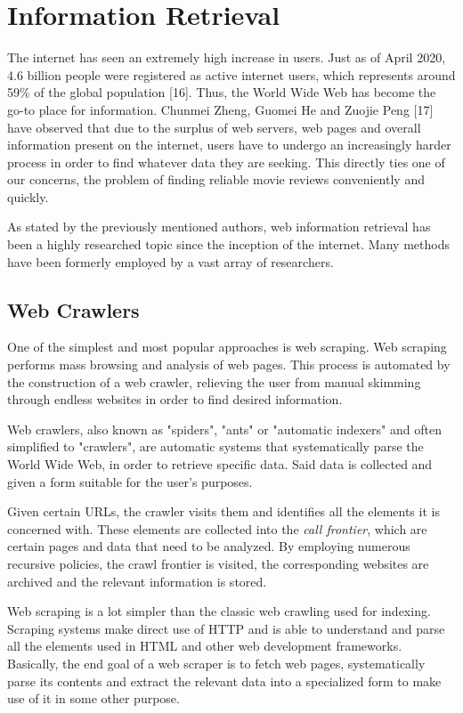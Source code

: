 \documentclass[12pt,a4paper,twoside]{report}
\begin{document}
\section{Information Retrieval}

The internet has seen an extremely high increase in users. Just as of April 2020, 4.6 billion people were registered as active internet users, which represents around 59\% of the global population [16]. Thus, the World Wide Web has become the go-to place for information. 
Chunmei Zheng, Guomei He and Zuojie Peng [17] have observed that due to the surplus of web servers, web pages and overall information present on the internet, users have to undergo an increasingly harder process in order to find whatever data they are seeking. This directly ties one of our concerns, the problem of finding reliable movie reviews conveniently and quickly.

As stated by the previously mentioned authors, web information retrieval has been a highly researched topic since the inception of the internet. Many methods have been formerly employed by a vast array of researchers. 

\subsection{Web Crawlers}

One of the simplest and most popular approaches is web scraping. Web scraping performs mass browsing and analysis of web pages. This process is automated by the construction of a web crawler, relieving the user from manual skimming through endless websites in order to find desired information.

Web crawlers, also known as "spiders", "ants" or "automatic indexers" and often simplified to "crawlers", are automatic systems that systematically parse the World Wide Web, in order to retrieve specific data. Said data is collected and given a form suitable for the user's purposes.

Given certain URLs, the crawler visits them and identifies all the elements it is concerned with. These elements are collected into the \textit{call frontier}, which are certain pages and data that need to be analyzed. By employing numerous recursive policies, the crawl frontier is visited, the corresponding websites are archived and the relevant information is stored.

Web scraping is a lot simpler than the classic web crawling used for indexing. Scraping systems make direct use of HTTP and is able to understand and parse all the elements used in HTML and other web development frameworks. Basically, the end goal of a web scraper is to fetch web pages, systematically parse its contents and extract the relevant data into a specialized form to make use of it in some other purpose.
\end{document}

